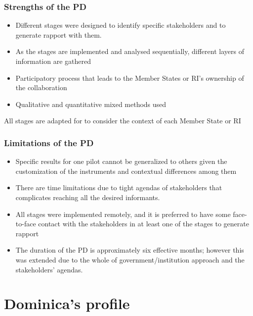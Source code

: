 \documentclass[
  10pt,
]{book}
\begin{document}
\hypertarget{strengths-of-the-pd}{%
\subsection*{Strengths of the PD}\label{strengths-of-the-pd}}

\begin{itemize}
\item
  Different stages were designed to identify specific stakeholders and to generate rapport with them.
\item
  As the stages are implemented and analysed sequentially, different layers of information are gathered
\item
  Participatory process that leads to the Member States or RI's ownership of the collaboration
\item
  Qualitative and quantitative mixed methods used
\end{itemize}

All stages are adapted for to consider the context of each Member State or RI

\hypertarget{limitations-of-the-pd}{%
\subsection*{Limitations of the PD}\label{limitations-of-the-pd}}

\begin{itemize}
\item
  Specific results for one pilot cannot be generalized to others given the customization of the instruments and contextual differences among them
\item
  There are time limitations due to tight agendas of stakeholders that complicates reaching all the desired informants.
\item
  All stages were implemented remotely, and it is preferred to have some face-to-face contact with the stakeholders in at least one of the stages to generate rapport
\item
  The duration of the PD is approximately six effective months; however this was extended due to the whole of government/institution approach and the stakeholders' agendas.
\end{itemize}

\hypertarget{section4}{%
\chapter{Dominica's profile}\label{section4}}
\end{document}
